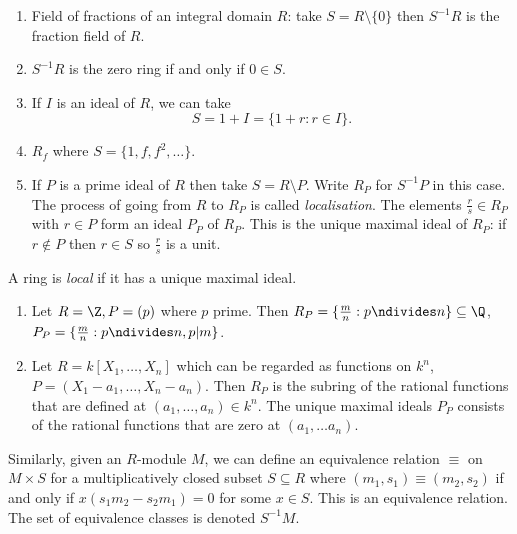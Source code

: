 \documentclass[a4paper]{article}
\begin{document}
\begin{eg}\leavevmode
  \begin{enumerate}
  \item Field of fractions of an integral domain \(R\): take \(S = R \setminus \{0\}\) then \(S^{-1}R\) is the fraction field of \(R\).
  \item \(S^{-1}R\) is the zero ring if and only if \(0 \in S\).
  \item If \(I\) is an ideal of \(R\), we can take
    \[
      S = 1 + I = \{1 + r: r \in I\}.
    \]
  \item \(R_f\) where \(S = \{1, f, f^2, \dots\}\).
  \item If \(P\) is a prime ideal of \(R\) then take \(S = R \setminus P\). Write \(R_P\) for \(S^{-1}P\) in this case. The process of going from \(R\) to \(R_P\) is called \emph{localisation}. The elements \(\frac{r}{s} \in R_P\) with \(r \in P\) form an ideal \(P_P\) of \(R_P\). This is the unique maximal ideal of \(R_P\): if \(r \notin P\) then \(r \in S\) so \(\frac{r}{s}\) is a unit.
  \end{enumerate}
\end{eg}

\begin{definition}
  A ring is \emph{local} if it has a unique maximal ideal.
\end{definition}

\begin{eg}\leavevmode
  \begin{enumerate}
  \item Let \(R = \Z, P = (p)\) where \(p\) prime. Then \(R_P = \{\frac{m}{n}: p \ndivides n\} \subseteq \Q\), \(P_P = \{\frac{m}{n}: p \ndivides n, p |m\}\).
  \item Let \(R = k[X_1, \dots, X_n]\) which can be regarded as functions on \(k^n\), \(P = (X_1 - a_1, \dots, X_n - a_n)\). Then \(R_P\) is the subring of the rational functions that are defined at \((a_1, \dots, a_n) \in k^n\). The unique maximal ideals \(P_P\) consists of the rational functions that are zero at \((a_1, \dots a_n)\).
  \end{enumerate}
\end{eg}

Similarly, given an \(R\)-module \(M\), we can define an equivalence relation \(\equiv\) on \(M \times S\) for a multiplicatively closed subset \(S \subseteq R\) where \((m_1, s_1) \equiv (m_2, s_2)\) if and only if \(x(s_1m_2 - s_2m_1) = 0\) for some \(x \in S\). This is an equivalence relation. The set of equivalence classes is denoted \(S^{-1}M\).
\end{document}
